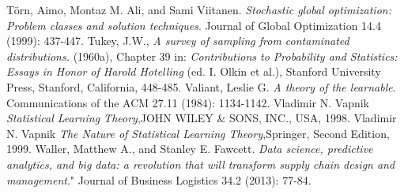 \documentclass{book}
\theoremstyle{plain}
\theoremstyle{definition}
\theoremstyle{remark}
\begin{document}
\begin{thebibliography}{9}
 Törn, Aimo, Montaz M. Ali, and Sami Viitanen. \emph{Stochastic global optimization: Problem classes and solution techniques}. Journal of Global Optimization 14.4 (1999): 437-447.
 Tukey, J.W., \emph{A survey of sampling from contaminated distributions.} (1960a), Chapter 39 in: \emph{Contributions to Probability and Statistics: Essays in Honor of Harold Hotelling} (ed. I. Olkin et al.), Stanford University Press, Stanford, California, 448-485.
 Valiant, Leslie G. \emph{A theory of the learnable}. Communications of the ACM 27.11 (1984): 1134-1142.
 Vladimir N. Vapnik  \emph{Statistical Learning Theory},JOHN WILEY \& SONS, INC., USA, 1998.
 Vladimir N. Vapnik  \emph{The Nature of Statistical Learning Theory},Springer, Second Edition, 1999.
 Waller, Matthew A., and Stanley E. Fawcett. \emph{Data science, predictive analytics, and big data: a revolution that will transform supply chain design and management}." Journal of Business Logistics 34.2 (2013): 77-84.

\end{thebibliography}
\end{document}
